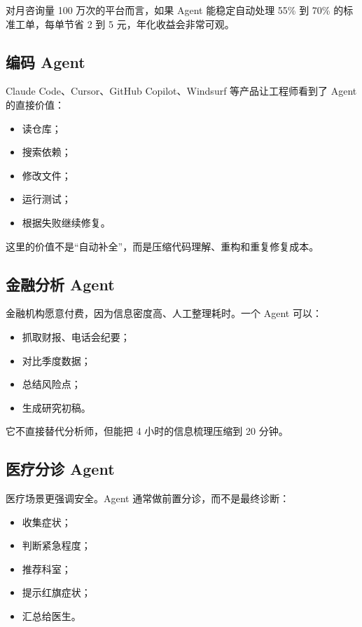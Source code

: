 对月咨询量 100 万次的平台而言，如果 Agent 能稳定自动处理 55\% 到 70\% 的标准工单，每单节省 2 到 5 元，年化收益会非常可观。


\subsection{编码 Agent}

Claude Code、Cursor、GitHub Copilot、Windsurf 等产品让工程师看到了 Agent 的直接价值：


\begin{itemize}[leftmargin=2em]
\item 读仓库；
\item 搜索依赖；
\item 修改文件；
\item 运行测试；
\item 根据失败继续修复。
\end{itemize}

这里的价值不是``自动补全''，而是压缩代码理解、重构和重复修复成本。


\subsection{金融分析 Agent}

金融机构愿意付费，因为信息密度高、人工整理耗时。一个 Agent 可以：


\begin{itemize}[leftmargin=2em]
\item 抓取财报、电话会纪要；
\item 对比季度数据；
\item 总结风险点；
\item 生成研究初稿。
\end{itemize}

它不直接替代分析师，但能把 4 小时的信息梳理压缩到 20 分钟。


\subsection{医疗分诊 Agent}

医疗场景更强调安全。Agent 通常做前置分诊，而不是最终诊断：


\begin{itemize}[leftmargin=2em]
\item 收集症状；
\item 判断紧急程度；
\item 推荐科室；
\item 提示红旗症状；
\item 汇总给医生。
\end{itemize}

